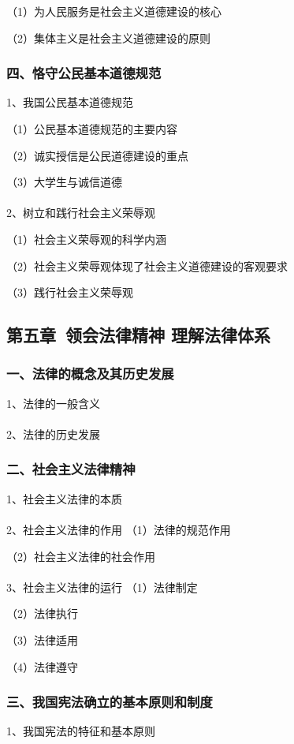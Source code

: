 \documentclass{ctexart}
\begin{document}
（1）为人民服务是社会主义道德建设的核心

（2）集体主义是社会主义道德建设的原则

\subsubsection{四、恪守公民基本道德规范}
1、我国公民基本道德规范

（1）公民基本道德规范的主要内容

（2）诚实授信是公民道德建设的重点

（3）大学生与诚信道德
\\\\

2、树立和践行社会主义荣辱观

（1）社会主义荣辱观的科学内涵

（2）社会主义荣辱观体现了社会主义道德建设的客观要求

（3）践行社会主义荣辱观



\subsection{第五章\ 领会法律精神 理解法律体系}
\subsubsection{一、法律的概念及其历史发展}

1、法律的一般含义
\\\\

2、法律的历史发展

\subsubsection{二、社会主义法律精神}
1、社会主义法律的本质
\\\\

2、社会主义法律的作用
（1）法律的规范作用

（2）社会主义法律的社会作用
\\\\

3、社会主义法律的运行
（1）法律制定

（2）法律执行

（3）法律适用

（4）法律遵守

\subsubsection{三、我国宪法确立的基本原则和制度}
1、我国宪法的特征和基本原则
\end{document}
